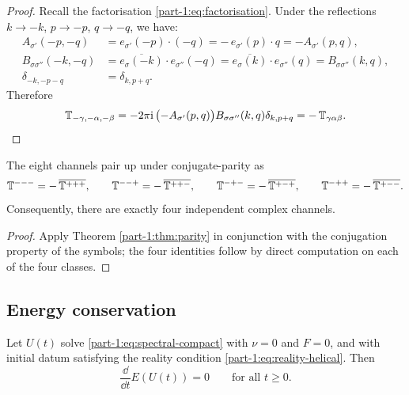 \begin{proof}
Recall the factorisation \eqref{part-1:eq:factorisation}. Under the 
reflections $k\to -k$, $p\to -p$, $q\to -q$, we have:
\begin{align*}
A_{\sigma'}(-p,-q) &= e_{\sigma'}(-p)\cdot(-q) 
= -\,e_{\sigma'}(p)\cdot q 
= -A_{\sigma'}(p,q), \\
B_{\sigma\sigma''}(-k,-q) &= \overline{e_\sigma(-k)}\cdot e_{\sigma''}(-q)
= \overline{e_\sigma(k)}\cdot e_{\sigma''}(q) 
= B_{\sigma\sigma''}(k,q), \\
\delta_{-k,-p-q} &= \delta_{k,p+q}.
\end{align*}
Therefore
\begin{equation*}
\mathbb{T}_{-\gamma,-\alpha,-\beta} 
= -2\pi\mathrm{i}\, \bigl(-A_{\sigma'}(p,q)\bigr) B_{\sigma\sigma''}(k,q) \delta_{k,p+q}
= -\,\mathbb{T}_{\gamma\alpha\beta}.\qedhere
\end{equation*}
\end{proof}

\begin{corollary}\label{part-1:cor:channel-pair}
The eight channels pair up under conjugate-parity as
\begin{equation}\label{part-1:eq:channel-pairings}
\mathbb{T}^{---} = -\,\overline{\mathbb{T}^{+++}},
\qquad
\mathbb{T}^{--+} = -\,\overline{\mathbb{T}^{++-}},
\qquad
\mathbb{T}^{-+-} = -\,\overline{\mathbb{T}^{+-+}},
\qquad
\mathbb{T}^{-++} = -\,\overline{\mathbb{T}^{+--}}.
\end{equation}
Consequently, there are exactly four independent complex channels.
\end{corollary}

\begin{proof}
Apply Theorem \ref{part-1:thm:parity} in conjunction with the 
conjugation property of the symbols; the four identities follow by 
direct computation on each of the four classes.
\end{proof}

\subsection{Energy conservation}
\label{part-1:ssec:energy-cons}

\begin{theorem}\label{part-1:thm:energy}
Let $U(t)$ solve \eqref{part-1:eq:spectral-compact} with $\nu = 0$ and $F = 0$, 
and with initial datum satisfying the reality condition 
\eqref{part-1:eq:reality-helical}. Then
\begin{equation}\label{part-1:eq:energy-conservation}
\frac{\dd}{\dd t} E(U(t)) = 0
\qquad\text{for all }t\geq 0.
\end{equation}
\end{theorem}

